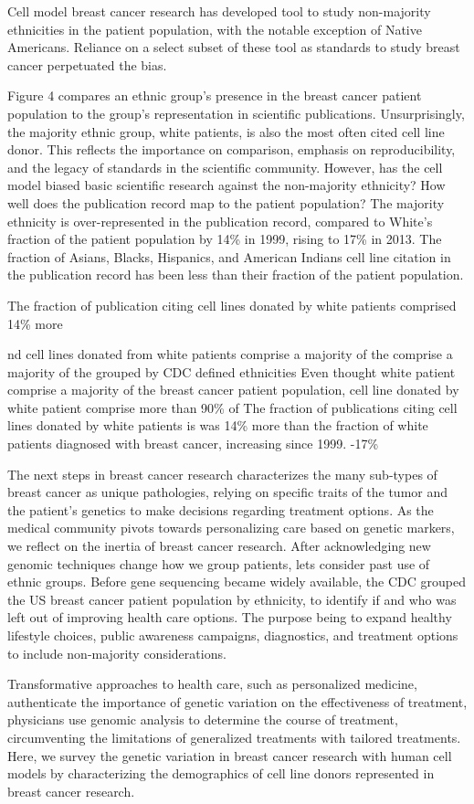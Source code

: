 Cell model breast cancer research has developed tool to study non-majority ethnicities in the patient population, with the notable exception of Native Americans. Reliance on a select subset of these tool as standards to study breast cancer perpetuated the bias. 


Figure 4 compares an ethnic group's presence in the breast cancer patient population to the group's representation in scientific publications. Unsurprisingly, the majority ethnic group, white patients, is also the most often cited cell line donor. This reflects the importance on comparison, emphasis on reproducibility, and the legacy of standards in the scientific community. However, has the cell model biased basic scientific research against the non-majority ethnicity? How well does the publication record map to the patient population? The majority ethnicity is over-represented in the publication record, compared to White's fraction of the patient population by 14\% in 1999, rising to 17\% in 2013. The fraction of Asians, Blacks, Hispanics, and American Indians cell line citation in the publication record has been less than their fraction of the patient population.  



The fraction of publication citing cell lines donated by white patients comprised 14\% more 

nd cell lines donated from white patients comprise a majority of the comprise a majority of the  grouped by CDC defined ethnicities 
Even thought white patient comprise a majority of the breast cancer patient population, cell line donated by white patient comprise more than 90\% of 
The fraction of publications citing cell lines donated by white patients is  was 14\% more than the fraction of white patients diagnosed with breast cancer, increasing since 1999. -17\%

 The next steps in breast cancer research characterizes the many sub-types of breast cancer as unique pathologies, relying on specific traits of the tumor and the patient's genetics to make decisions regarding treatment options. As the medical community pivots towards personalizing care based on genetic markers, we reflect on the inertia of breast cancer research. After acknowledging new genomic techniques change how we group patients, lets consider past use of ethnic groups. Before gene sequencing became widely available, the CDC grouped the US breast cancer patient population by ethnicity, to identify if and who was left out of improving health care options. The purpose being to expand healthy lifestyle choices, public awareness campaigns, diagnostics, and treatment options to include non-majority considerations. 

Transformative approaches to health care, such as personalized medicine, authenticate the importance of genetic variation on the effectiveness of treatment, physicians use genomic analysis to determine the course of treatment, circumventing the limitations of generalized treatments with tailored treatments. Here, we survey the genetic variation in breast cancer research with human cell models by characterizing the demographics of cell line donors represented in breast cancer research. 


